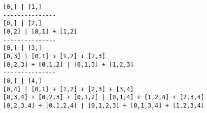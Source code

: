 \begin{small}
	\begin{verbatim}
		[0,] | [1,]
		---------------
		[0,] | [2,]
		[0,2] | [0,1] + [1,2]
		---------------
		[0,] | [3,]
		[0,3] | [0,1] + [1,2] + [2,3]
		[0,2,3] + [0,1,2] | [0,1,3] + [1,2,3]
		---------------
		[0,] | [4,]
		[0,4] | [0,1] + [1,2] + [2,3] + [3,4]
		[0,3,4] + [0,2,3] + [0,1,2] | [0,1,4] + [1,2,4] + [2,3,4]
		[0,2,3,4] + [0,1,2,4] | [0,1,2,3] + [0,1,3,4] + [1,2,3,4]
	\end{verbatim}
\end{small}